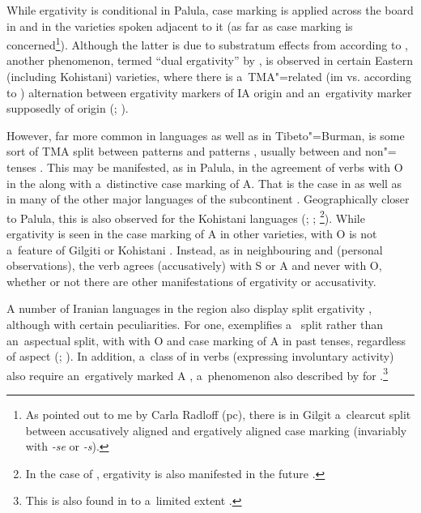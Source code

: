 While ergativity is conditional in Palula,  case marking is applied across the board in \iliBurushaski and in the \iliShina varieties spoken adjacent to it (as far as case marking is concerned\footnote{As pointed out to me by Carla Radloff (pc), there is in Gilgit \iliShina a~clearcut split between accusatively aligned  and ergatively aligned case marking (invariably with \textit{-se} or \textit{-s}).}). Although the latter is due to substratum effects from \iliBurushaski according to \citet[248]{masica2001}, another phenomenon, termed ``dual ergativity'' by \citet[213]{hookkoul2004}, is observed in certain Eastern (including Kohistani) \iliShina varieties, where there is a~TMA"=related (im vs.  according to \citealt[51--53]{schmidtkohistani2008}) alternation between ergativity markers of IA origin and an~ergativity marker supposedly of \iliTibetan origin (\citealt[214]{hookkoul2004}; \citealt[211]{bailey1924}). 


\largerpage
However, far more common in \iliNIA languages as well as in Tibeto"=Burman, is some sort of TMA split between  patterns and  patterns \citep[248]{masica2001}, usually between  and non"= tenses \citep[342--343]{masica1991}. This may be manifested, as in Palula, in the agreement of  verbs with O in the  along with a~distinctive case marking of A. That is the case in \iliUrduHindi \citep[124]{schmidt1999} as well as in many of the other major \iliNIA languages of the subcontinent \citep[248]{masica2001}. Geographically closer to Palula, this is also observed for the Kohistani languages (\citealt[136]{baart1999a}; \citealt[34]{hallberghallberg1999}; \citealt[93--95]{lunsford2001}\footnote{In the case of \iliTorwali, ergativity is also manifested in the future .}). While ergativity is seen in the case marking of A in other \iliShina varieties,  with O is not a~feature of Gilgiti or Kohistani \iliShina. Instead, as in neighbouring \iliDameli and \iliGawarbati (personal observations), the verb agrees (accusatively) with S or A and never with O, whether or not there are other manifestations of ergativity or accusativity.



A number of Iranian languages in the region also display split ergativity \citep{payne1980}, although with certain peculiarities. For one, \iliPashto exemplifies a~ split rather than an~aspectual split, with  with O and  case marking of A in past tenses, regardless of aspect (\citealt[4--5]{tegey1977}; \citealt[71--72]{lorenz1979}). In addition, a~class of in verbs (expressing involuntary activity) also require an~ergatively marked A \citep[112]{babrakzai1999}, a~phenomenon also described by \citet[217]{hookkoul2004} for \iliIndoAryan \iliKashmiri.\footnote{This is also found in \iliUrdu to a~limited extent \citep[168]{schmidt1999}.} 



